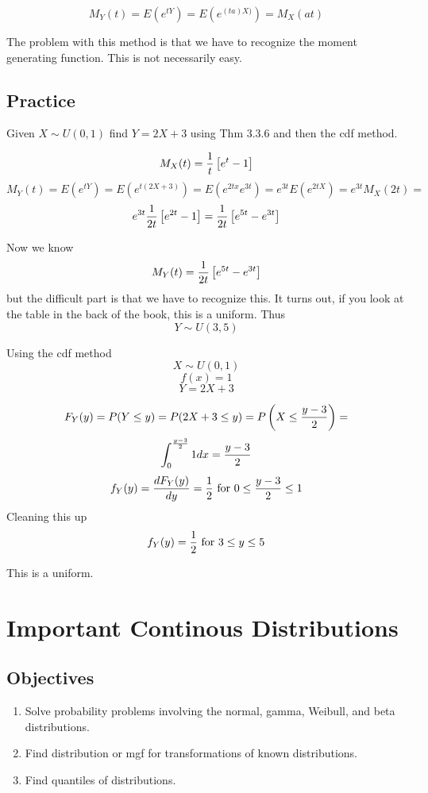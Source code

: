 \documentclass[]{book}
\providecommand{\tightlist}{%
  \setlength{\itemsep}{0pt}\setlength{\parskip}{0pt}}
\theoremstyle{definition}
\theoremstyle{definition}
\theoremstyle{definition}
\theoremstyle{remark}
\begin{document}
\[M_{Y}(t)=E(e^{tY})=E(e^{(ta)X)})=M_{X}(at)\]

The problem with this method is that we have to recognize the moment
generating function. This is not necessarily easy.

\subsection{Practice}\label{practice-3}

Given \(X\sim U(0,1)\) find \(Y=2X+3\) using Thm 3.3.6 and then the cdf
method.

\[M_{X}(t)={1 \over t}\left[e^{t}-1\right]\]
\[M_{Y}(t)=E(e^{tY})=E(e^{t(2X+3)})=E(e^{2tx}e^{3t})=e^{3t}E(e^{2tX})=e^{3t}M_{X}(2t)=\]
\[e^{3t}{1 \over 2t}\left[e^{2t}-1\right] = {1 \over 2t}\left[e^{5t}-e^{3t}\right]\]

Now we know \[M_{Y}(t)={1 \over 2t}\left[e^{5t}-e^{3t}\right]\] but the
difficult part is that we have to recognize this. It turns out, if you
look at the table in the back of the book, this is a uniform. Thus
\[Y \sim U(3,5)\]

Using the cdf method \[X \sim U(0,1)\] \[f(x)=1\] \[Y=2X+3\]

\[F_{Y}(y)=P(Y \leq y)=P(2X+3 \leq y)=P\left( X \leq {y-3 \over 2}\right) =\]
\[\int_{0}^{{y-3 \over 2}}1dx={y-3 \over 2}\]
\[f_{Y}(y)={dF_{Y}(y) \over dy}={1 \over 2} \mbox{ for } 0 \leq {y-3 \over 2} \leq 1\]
Cleaning this up \[f_{Y}(y)={1 \over 2} \mbox{ for } 3 \leq y \leq 5\]

This is a uniform.

\hypertarget{L15}{\section{Important Continous
Distributions}\label{L15}}

\subsection{Objectives}\label{objectives-14}

\begin{enumerate}
\def\labelenumi{\arabic{enumi}.}
\tightlist
\item
  Solve probability problems involving the normal, gamma, Weibull, and
  beta distributions.
\item
  Find distribution or mgf for transformations of known distributions.
\item
  Find quantiles of distributions.
\end{enumerate}
\end{document}

